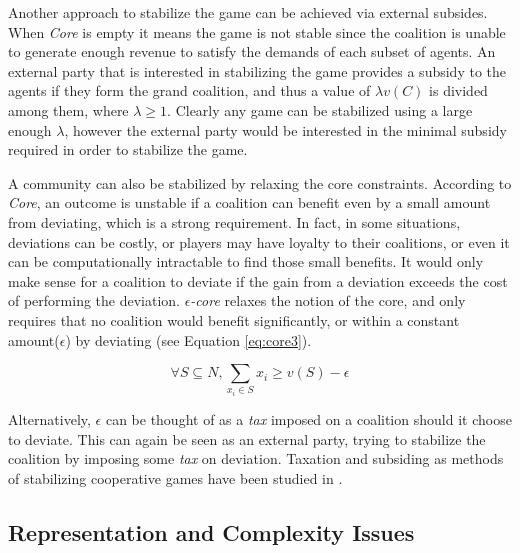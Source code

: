         Another approach to stabilize the game can be achieved via external subsides. When \emph{Core} is empty it means the game is not stable since the coalition is unable to generate enough revenue to satisfy the demands of each subset of agents. An external party that is interested in stabilizing the game provides a subsidy to the agents if they form the grand coalition, and thus a value of $\lambda v(C)$ is divided among them, where $\lambda \geq 1$. Clearly any game can be stabilized using a large enough $\lambda$, however the external party would be interested in the minimal subsidy required in order to stabilize the game.

        A community can also be stabilized by relaxing the core constraints. According to \emph{Core}, an outcome is unstable if a coalition can benefit even by a small amount from deviating, which is a strong requirement. In fact, in some situations, deviations can be costly, or players may have loyalty to their coalitions, or even it can be computationally intractable to find those small benefits. It would only make sense for a coalition to deviate if the gain from a deviation exceeds the cost of performing the deviation. \emph{$\epsilon$-core} relaxes the notion of the core, and only requires that no coalition would benefit significantly, or within a constant amount($\epsilon$) by deviating (see Equation \ref{eq:core3}).

           \begin{equation}\label{eq:core3}
               \forall S \subseteq N, \sum_{x_i \in S} x_i \geq v(S) - \epsilon
           \end{equation}

        Alternatively, $\epsilon$ can be thought of as a \emph{tax} imposed on a coalition should it choose to deviate. This can again be seen as an external party, trying to stabilize the coalition by imposing some \emph{tax} on deviation. Taxation and subsiding as methods of stabilizing cooperative games have been studied in \cite{RePEc:spr:jogath:v:38:y:2009:i:1:p:3-16, Bachrach:2009:CSC:1692490.1692502, conf/ijcai/MeirRM11}.


        \subsection{Representation and Complexity Issues}\label{sec:CWSArchitecture}

